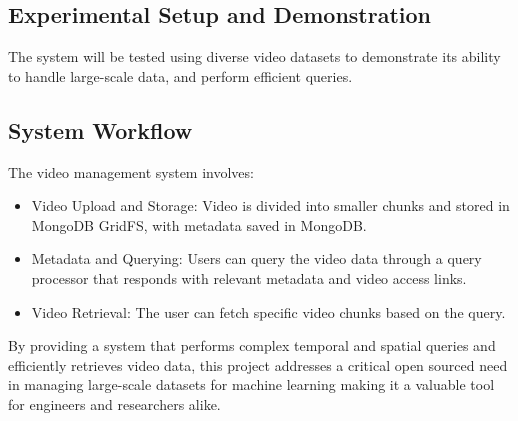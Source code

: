 \documentclass[conference]{IEEEtran}
\begin{document}
\subsection{Experimental Setup and Demonstration}

The system will be tested using diverse video datasets to demonstrate its ability to handle large-scale data, and perform efficient queries.

\subsection{System Workflow}

The video management system involves:

\begin{itemize}
    \item Video Upload and Storage: Video is divided into smaller chunks and stored in MongoDB GridFS\cite{mongodb_gridfs}, with metadata saved in MongoDB\cite{mongodb}.
    \item Metadata and Querying: Users can query the video data through a query processor that responds with relevant metadata and video access links.
    \item Video Retrieval: The user can fetch specific video chunks based on the query.
\end{itemize}

By providing a system that performs complex temporal and spatial queries and efficiently retrieves video data, this project addresses a critical open sourced need in managing large-scale datasets for machine learning making it a valuable tool for engineers and researchers alike.
\end{document}
